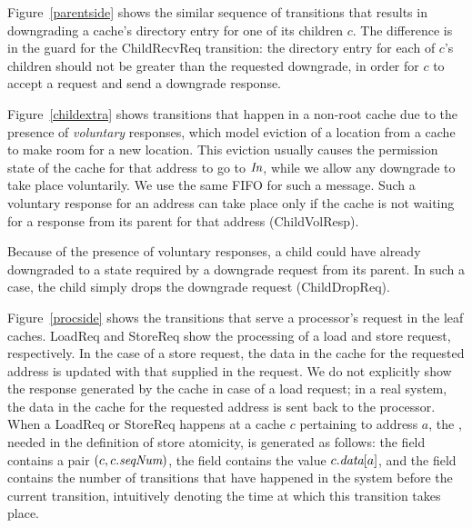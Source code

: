 Figure~\ref{parentside} shows the similar sequence of transitions that results
in downgrading a cache's directory entry for one of its children $c$. The
difference is in the guard for the ChildRecvReq transition: the directory entry for
each of $c$'s children should not be greater than the requested
downgrade, in order for $c$ to accept a request and send a downgrade
response.

Figure~\ref{childextra} shows transitions that happen in a non-root cache due
to the presence of \emph{voluntary} responses, which model eviction of a
location from a cache to make room for a new location. This eviction usually
causes the permission state of the cache for that address to go to $\textit{In}$, while
we allow any downgrade to take place voluntarily.  We use the same \cpResp{}
FIFO for such a message. Such a voluntary response for an address can take
place only if the cache is not waiting for a response from its parent for that
address (ChildVolResp).

Because of the presence of voluntary responses, a child could have already
downgraded to a state required by a downgrade request from its parent. In such
a case, the child simply drops the downgrade request (ChildDropReq).

Figure~\ref{procside} shows the transitions that serve a processor's request in
the leaf caches. LoadReq and StoreReq show the processing of a load and store
request, respectively. In the case of a store request, the data in the cache
for the requested address is updated with that supplied in the request. We do
not explicitly show the response generated by the cache in case of a load
request; in a real system, the data in the cache for the requested address is
sent back to the processor. When a LoadReq or StoreReq happens at a cache $c$
pertaining to address $a$, the \Response{}, needed in the definition of store
atomicity, is generated as follows: the  field contains a pair $(c, c.\textit{seqNum})$,
the \dataR{} field contains the value $c.\textit{data}[a]$, and the \timeR{} field
contains the number of transitions that have happened in the system before
the current transition, intuitively denoting the time at which this transition
takes place.


